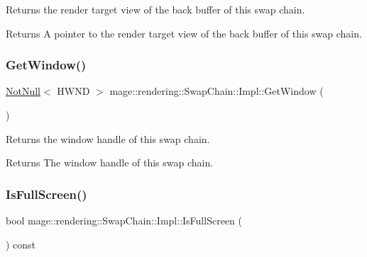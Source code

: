 Returns the render target view of the back buffer of this swap chain.

\begin{DoxyReturn}{Returns}
A pointer to the render target view of the back buffer of this swap chain. 
\end{DoxyReturn}
\mbox{\label{classmage_1_1rendering_1_1_swap_chain_1_1_impl_a58ee8003efb4b792d6e6315a1a691b5c}} 
\subsubsection{\texorpdfstring{Get\+Window()}{GetWindow()}}
{\footnotesize\ttfamily \mbox{\hyperlink{namespacemage_a8769f9d670d6b585ea306cb1062af94b}{Not\+Null}}$<$ H\+W\+ND $>$ mage\+::rendering\+::\+Swap\+Chain\+::\+Impl\+::\+Get\+Window (\begin{DoxyParamCaption}{ }\end{DoxyParamCaption})\hspace{0.3cm}{\ttfamily [noexcept]}}

Returns the window handle of this swap chain.

\begin{DoxyReturn}{Returns}
The window handle of this swap chain. 
\end{DoxyReturn}
\mbox{\label{classmage_1_1rendering_1_1_swap_chain_1_1_impl_abd74163f68b0a078f970d3d54d1dcd7e}} 
\subsubsection{\texorpdfstring{Is\+Full\+Screen()}{IsFullScreen()}}
{\footnotesize\ttfamily bool mage\+::rendering\+::\+Swap\+Chain\+::\+Impl\+::\+Is\+Full\+Screen (\begin{DoxyParamCaption}{ }\end{DoxyParamCaption}) const\hspace{0.3cm}{\ttfamily [noexcept]}}


